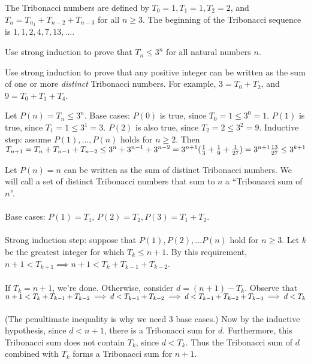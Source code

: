 \documentclass[solution, letterpaper]{cs20}
\begin{document}

The Tribonacci numbers are defined by $T_0 = 1, T_1 = 1, T_2 = 2$, and $T_n = T_{n_1} + T_{n-2} + T_{n-3}$ for all $n \ge 3$. The beginning of the Tribonacci sequence is $1, 1, 2, 4, 7, 13, ...$. 

\subproblem Use strong induction to prove that $T_n \le 3^n$ for all natural numbers $n$.

\subproblem Use strong induction to prove that any positive integer can be written as the sum of one or more \textit{distinct} Tribonacci numbers. For example, $3 = T_0 + T_2$, and $9 = T_0 + T_1 + T_4$.

\begin{solution}
\subsolution 
Let $P(n) = T_n \le 3^n$. Base cases: $P(0)$ is true, since $T_0 = 1 \le 3^0 = 1$. $P(1)$ is true, since $T_1 = 1 \le 3^1 = 3$. $P(2)$ is also true, since $T_2 = 2 \le 3^2 = 9$. Inductive step: assume $P(1), ..., P(n)$ holds for $n \ge 2$. Then 
\begin{math}
T_{n+1} = T_n + T_{n-1} + T_{n-2}
\\ \le 3^n + 3^{n-1} + 3^{n-2}
\\ = 3^{n+1}(\frac{1}{3} + \frac{1}{9} + \frac{1}{27})
\\ = 3^{n+1}\frac{13}{27}
\\ \le 3^{k+1}
\end{math}

\subsolution
Let $P(n) = n$ can be written as the sum of distinct Tribonacci numbers. We will call a set of distinct Tribonacci numbers that sum to $n$ a ``Tribonacci sum of $n$''. 
\\\\
Base cases: $P(1) = T_1$, $P(2) = T_2, P(3) = T_1 + T_2$. 
\\\\
Strong induction step: suppose that $P(1), P(2), ... P(n)$ hold for $n \ge 3$. Let $k$ be the greatest integer for which $T_k \le n+1$. By this requirement, $n+1 < T_{k+1} \implies n+1 < T_k + T_{k-1} + T_{k-2}$. 
\\\\If $T_k = n+1$, we're done. Otherwise, consider $d = (n+1)-T_k$. Observe that 
\begin{math}
n+1 < T_k + T_{k-1} + T_{k-2} 
\\ \implies d < T_{k-1} + T_{k-2}
\\ \implies d < T_{k-1} + T_{k-2} + T_{k-3} 
\\ \implies d < T_k
\end{math}
\\\\(The penultimate inequality is why we need 3 base cases.)  Now by the inductive hypothesis, since $d < n+1$, there is a Tribonacci sum for $d$. Furthermore, this Tribonacci sum does not contain $T_k$, since $d < T_k$. Thus the Tribonacci sum of $d$ combined with $T_k$ forms a Tribonacci sum for $n+1$.
\end{solution}
\end{document}
